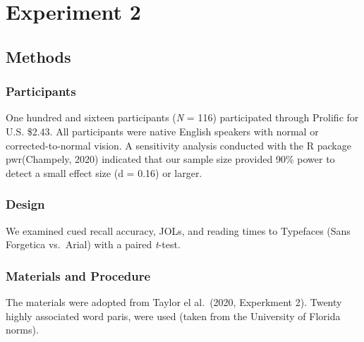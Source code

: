 \documentclass[
  english,
  man]{apa6}
\begin{document}
\hypertarget{experiment-2}{%
\section{Experiment 2}\label{experiment-2}}

\hypertarget{methods}{%
\subsection{Methods}\label{methods}}

\hypertarget{participants-1}{%
\subsubsection{Participants}\label{participants-1}}

One hundred and sixteen participants (\emph{N} = 116) participated through Prolific for U.S. \$2.43. All participants were native English speakers with normal or corrected-to-normal vision. A sensitivity analysis conducted with the R package pwr(Champely, 2020) indicated that our sample size provided 90\% power to detect a small effect size (d = 0.16) or larger.

\hypertarget{design-1}{%
\subsubsection{Design}\label{design-1}}

We examined cued recall accuracy, JOLs, and reading times to Typefaces (Sans Forgetica vs.~Arial) with a paired \emph{t}-test.

\hypertarget{materials-and-procedure}{%
\subsubsection{Materials and Procedure}\label{materials-and-procedure}}

The materials were adopted from Taylor el al.~(2020, Experkment 2). Twenty highly associated word paris, were used (taken from the University of Florida norms).
\end{document}
